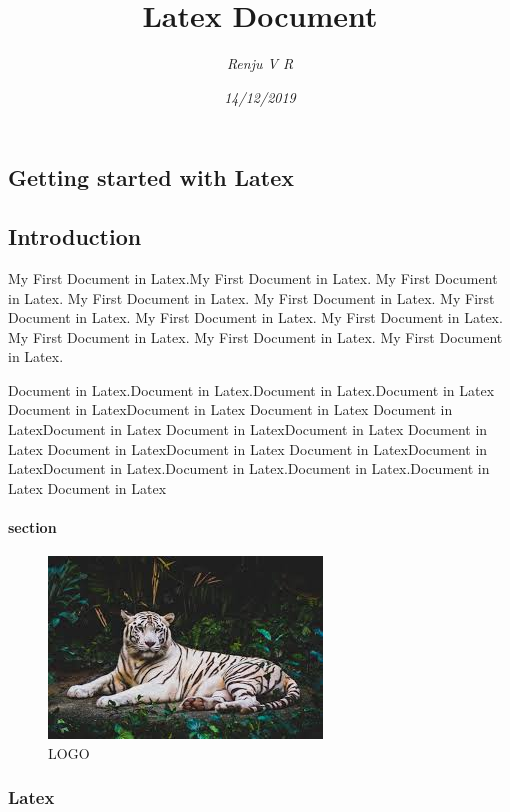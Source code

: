 \documentclass[12pt]{report} %
\begin{document}

\title{\textbf{Latex Document}}
\author{\textit{Renju V R}}
\date{\textit{14/12/2019}}
\maketitle
\begin{multicols}{2}

\chapter{Getting started with Latex }
\section{Introduction}
My First Document in Latex.My First Document in Latex. My First Document in Latex. My First Document in Latex. My First Document in Latex. My First Document in Latex. My First Document in Latex. My First Document in Latex. My First Document in Latex. My First Document in Latex. My First Document in Latex.  

Document in Latex.Document in Latex.Document in Latex.Document in Latex Document in LatexDocument in Latex Document in Latex Document in LatexDocument in Latex Document in LatexDocument in Latex Document in Latex Document in LatexDocument in Latex Document in LatexDocument in LatexDocument in Latex.Document in Latex.Document in Latex.Document in Latex Document in Latex
\subsubsection{section}
\begin{figure}[H]
\centering
\includegraphics{index.jpeg}
\caption{LOGO}
\end{figure}
\subsection{Latex}




\end{multicols}
\end{document}
